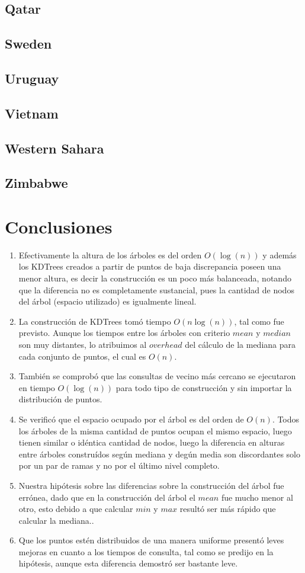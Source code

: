 \documentclass[12pt,letterpaper, margin = 3cm]{article}
\begin{document}
\subsection{Qatar}
\subsection{Sweden}
\subsection{Uruguay}
\subsection{Vietnam}
\subsection{Western Sahara}
\subsection{Zimbabwe}

\newpage
\section{Conclusiones}
\begin{enumerate} 
\item Efectivamente la altura de los árboles es del orden $O(\log(n))$ y además los KDTrees creados a partir de puntos de baja discrepancia poseen una menor altura, es decir la construcción es un poco más balanceada, notando que la diferencia no es completamente sustancial, pues la cantidad de nodos del árbol (espacio utilizado) es igualmente lineal.
\item La construcción de KDTrees tomó tiempo $O(n\log(n))$, tal como fue previsto. Aunque los tiempos entre los árboles con criterio $mean$ y $median$ son muy distantes, lo atribuimos al $overhead$ del cálculo de la mediana para cada conjunto de puntos, el cual es $O(n)$.
\item También se comprobó que las consultas de vecino más cercano se ejecutaron en tiempo $O(\log(n))$ para todo tipo de construcción y sin importar la distribución de puntos.
\item Se verificó que el espacio ocupado por el árbol es del orden de $O(n)$. Todos los árboles de la misma cantidad de puntos ocupan el mismo espacio, luego tienen similar o idéntica cantidad de nodos, luego la diferencia en alturas entre árboles construídos según mediana y degún media son discordantes solo por un par de ramas y no por el último nivel completo.
\item Nuestra hipótesis sobre las diferencias sobre la construcción del árbol fue errónea, dado que en la construcción del árbol el $mean$ fue mucho menor al otro, esto debido a que calcular $min$ y $max$ resultó ser más rápido que calcular la mediana..
\item Que los puntos estén distribuidos de una manera uniforme presentó leves mejoras en cuanto a los tiempos de consulta, tal como se predijo en la hipótesis, aunque esta diferencia demostró ser bastante leve.
\end{enumerate}
\end{document}
